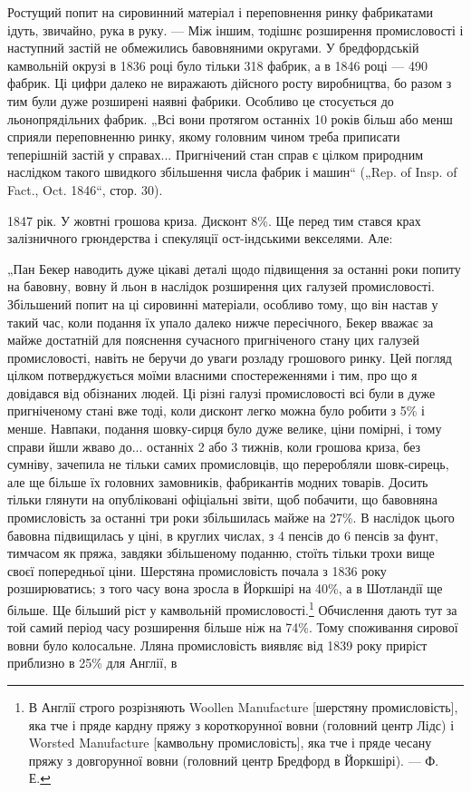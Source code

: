 Ростущий попит на сировинний матеріал і переповнення
ринку фабрикатами ідуть, звичайно, рука в руку. — Між іншим,
тодішнє розширення промисловості і наступний застій не обмежились
бавовняними округами. У бредфордській камвольній
окрузі в 1836 році було тільки 318 фабрик, а в 1846 році —
490 фабрик. Ці цифри далеко не виражають дійсного росту
виробництва, бо разом з тим були дуже розширені наявні фабрики.
Особливо це стосується до льонопрядільних фабрик. „Всі
вони протягом останніх 10 років більш або менш сприяли переповненню
ринку, якому головним чином треба приписати теперішній
застій у справах... Пригнічений стан справ є цілком природним
наслідком такого швидкого збільшення числа фабрик
і машин“ („Rep. of Insp. of Fact., Oct. 1846“, стор. 30).

1847 рік. У жовтні грошова криза. Дисконт 8\%. Ще перед
тим стався крах залізничного грюндерства і спекуляції ост-індськими
векселями. Але:

„Пан Бекер наводить дуже цікаві деталі щодо підвищення
за останні роки попиту на бавовну, вовну й льон в наслідок
розширення цих галузей промисловості. Збільшений попит на ці
сировинні матеріали, особливо тому, що він настав у такий час,
коли подання їх упало далеко нижче пересічного, Бекер вважає
за майже достатній для пояснення сучасного пригніченого стану
цих галузей промисловості, навіть не беручи до уваги розладу
грошового ринку. Цей погляд цілком потверджується моїми
власними спостереженнями і тим, про що я довідався від обізнаних
людей. Ці різні галузі промисловості всі були в дуже
пригніченому стані вже тоді, коли дисконт легко можна було
робити з 5\% і менше. Навпаки, подання шовку-сирця було дуже
велике, ціни помірні, і тому справи йшли жваво до... останніх
2 або 3 тижнів, коли грошова криза, без сумніву, зачепила не
тільки самих промисловців, що переробляли шовк-сирець, але
ще більше їх головних замовників, фабрикантів модних товарів.
Досить тільки глянути на опубліковані офіціальні звіти, щоб побачити,
що бавовняна промисловість за останні три роки збільшилась
майже на 27\%. В наслідок цього бавовна підвищилась
у ціні, в круглих числах, з 4 пенсів до 6 пенсів за фунт, тимчасом
як пряжа, завдяки збільшеному поданню, стоїть тільки
трохи вище своєї попередньої ціни. Шерстяна промисловість почала
з 1836 року розширюватись; з того часу вона зросла в
Йоркшірі на 40\%, а в Шотландії ще більше. Ще більший ріст
у камвольній промисловості.\footnote{
В Англії строго розрізняють Woollen Manufacture [шерстяну промисловість],
яка тче і пряде кардну пряжу з короткорунної вовни (головний центр Лідс)
і Worsted Manufacture [камвольну промисловість], яка тче і пряде чесану пряжу
з довгорунної вовни (головний центр Бредфорд в Йоркшірі). — Ф. Е.
} Обчислення дають тут за той
самий період часу розширення більше ніж на 74\%. Тому споживання
сирової вовни було колосальне. Лляна промисловість виявляє
від 1839 року приріст приблизно в 25\% для Англії, в